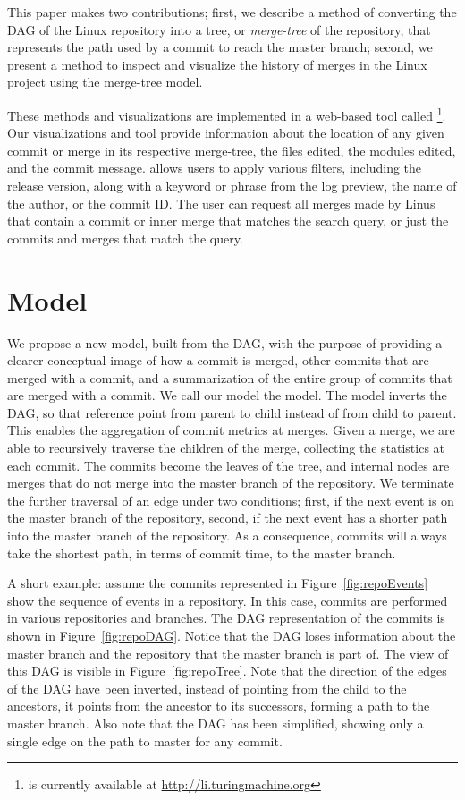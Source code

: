 \documentclass[draft]{IEEEtran}
\begin{document}
This paper makes two contributions; first, we describe a method of converting the
DAG of the Linux repository into a tree, or \emph{merge-tree} of the repository,
that represents the path used by a commit to reach the master branch; second, we
present a method to inspect and visualize the history of merges in the Linux project
using the merge-tree model.

These methods and visualizations are implemented in a web-based tool called
\tool\footnote{\tool is currently available at \url{http://li.turingmachine.org}}.
Our visualizations and tool provide information about the location of any given
commit or merge in its respective merge-tree, the files edited, the modules edited,
and the commit message. \tool allows users to apply various filters, including the
release version, along with a keyword or phrase from the log preview, the name of
the author, or the commit ID. The user can request all merges made by Linus that
contain a commit or inner merge that matches the search query, or just the commits
and merges that match the query.


\section{\mt Model}
\label{sec:mt_model}

We propose a new model, built from the DAG, with the purpose of
providing a clearer conceptual image of how a commit is merged, other
commits that are merged with a commit, and a summarization of the entire
group of commits that are merged with a commit. We call our model the
\mt model. The model inverts the DAG, so that reference point from
parent to child instead of from child to parent. This enables the
aggregation of commit metrics at merges. Given a merge, we are able to
recursively traverse the children of the merge, collecting the
statistics at each commit. The commits become the leaves of the tree,
and internal nodes are merges that do not merge into the master branch
of the repository. We terminate the further traversal of an edge under
two conditions; first, if the next event is on the master branch of the
repository, second, if the next event has a shorter path into the master
branch of the repository. As a consequence, commits will always take the
shortest path, in terms of commit time, to the master branch.

A short example: assume the commits represented in
Figure~\ref{fig:repoEvents} show the sequence of events in a repository.
In this case, commits are performed in various repositories and
branches. The DAG representation of the commits is shown in
Figure~\ref{fig:repoDAG}. Notice that the DAG loses information about
the master branch and the repository that the master branch is part of.
The \mt view of this DAG is visible in Figure~\ref{fig:repoTree}.
Note that the direction of the edges of the DAG have been inverted,
instead of pointing from the child to the ancestors, it points from the
ancestor to its successors, forming a path to the master branch. Also
note that the DAG has been simplified, showing only a single edge on the
path to master for any commit.
\end{document}
